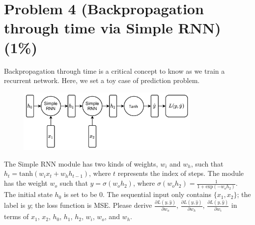 \documentclass{article}
\begin{document}
\section*{Problem 4 (Backpropagation through time via Simple RNN)(1\%)}
Backpropagation through time is a critical concept to know as we train a recurrent network. Here, we set a toy case of prediction problem. 
\begin{figure}[h]
    \centering
    \includegraphics[width=0.8\textwidth]{RNN.png}
\end{figure}
The Simple RNN module has two kinds of weights, $w_i$ and $w_h$, such that $h_t = \text{tanh}(w_ix_t + w_hh_{t-1})$, where $t$ represents the index of steps. The module has the weight $w_o$ such that $\hat{y} = \sigma(w_o h_2)$, where $\sigma(w_oh_2) = \frac{1}{1+\text{exp}(-w_o h_2)}$. The initial state $h_0$ is set to be $0$. The sequential input only contains $\{x_1, x_2\}$; the label is $y$; the loss function is MSE. Please derive $\frac{\partial L(y, \hat{y})}{\partial w_o}$, $\frac{\partial L(y, \hat{y})}{\partial w_h}$, $\frac{\partial L(y, \hat{y})}{\partial w_i}$ in terms of $x_1$, $x_2$, $h_0$, $h_1$, $h_2$, $w_i$, $w_o$, and $w_h$.
\end{document}
